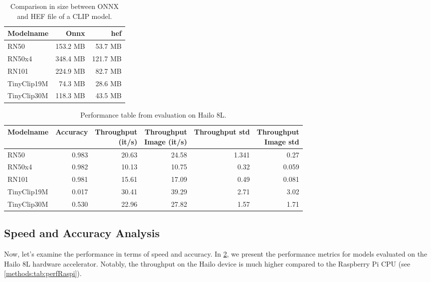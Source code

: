 \begin{table}
    \centering
    \begin{tabular}{l|rr}
    \hline
    Modelname & Onnx & \acrshort{hef}\\\hline
    RN50 & 153.2 MB & 53.7 MB \\ 
    RN50x4 & 348.4 MB & 121.7 MB  \\ 
    RN101 & 224.9 MB  & 82.7 MB \\
    TinyClip19M & 74.3 MB & 28.6 MB  \\ 
    TinyClip30M & 118.3 MB & 43.5 MB  \\ 
    \end{tabular}
    \caption{Comparison in size between ONNX and HEF file of a CLIP model.}
    \label{methods:tab:sizecompare}
\end{table}

\begin{table}[]
    \centering
    \begin{tabular}{l|rrrrr}
    \hline
    Modelname & Accuracy & \makecell{Throughput\\(it/s)} & \makecell{Throughput \\ Image (it/s)} & Throughput std & \makecell{Throughput\\Image std} \\ \hline
    RN50    & 0.983 & 20.63 & 24.58 & 1.341 & 0.27 \\ 
    RN50x4  & 0.982 & 10.13 & 10.75 & 0.32 & 0.059 \\ 
    RN101   & 0.981 & 15.61 & 17.09 & 0.49 & 0.081 \\ 
    TinyClip19M & 0.017 & 30.41 & 39.29 & 2.71 & 3.02 \\ 
    TinyClip30M & 0.530 & 22.96 & 27.82 & 1.57 & 1.71 \\ 
    \end{tabular}
    \caption{Performance table from evaluation on Hailo 8L.}
    \label{methods:tab:perfHailo}
\end{table}

\subsection{Speed and Accuracy Analysis}

Now, let's examine the performance in terms of speed and accuracy.
In \cref{methods:tab:perfHailo}, we present the performance metrics for models evaluated on the Hailo 8L hardware accelerator.
Notably, the throughput on the Hailo device is much higher compared to the Raspberry Pi CPU (see \cref{methods:tab:perfRaspi}).

